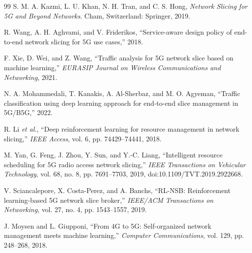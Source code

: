 \documentclass[12pt,a4paper]{report}
\begin{document}
\begin{thebibliography}{99}
S. M. A. Kazmi, L. U. Khan, N. H. Tran, and C. S. Hong,
\textit{Network Slicing for 5G and Beyond Networks}.
Cham, Switzerland: Springer, 2019.

R. Wang, A. H. Aghvami, and V. Friderikos,
``Service-aware design policy of end-to-end network slicing for 5G use
cases,'' 2018.

F. Xie, D. Wei, and Z. Wang,
``Traffic analysis for 5G network slice based on machine learning,''
\textit{EURASIP Journal on Wireless Communications and Networking},
2021.

N. A. Mohammedali, T. Kanakis, A. Al-Sherbaz, and M. O. Agyeman,
``Traffic classification using deep learning approach for end-to-end
slice management in 5G/B5G,'' 2022.

R. Li \textit{et al.},
``Deep reinforcement learning for resource management in network
slicing,'' \textit{IEEE Access}, vol. 6, pp. 74429--74441, 2018.

M. Yan, G. Feng, J. Zhou, Y. Sun, and Y.-C. Liang,
``Intelligent resource scheduling for 5G radio access network slicing,''
\textit{IEEE Transactions on Vehicular Technology}, vol. 68, no. 8,
pp. 7691--7703, 2019,
doi:10.1109/TVT.2019.2922668.

V. Sciancalepore, X. Costa-Perez, and A. Banchs,
``RL-NSB: Reinforcement learning-based 5G network slice broker,''
\textit{IEEE/ACM Transactions on Networking}, vol. 27, no. 4,
pp. 1543--1557, 2019.

J. Moysen and L. Giupponi,
``From 4G to 5G: Self-organized network management meets machine
learning,'' \textit{Computer Communications}, vol. 129,
pp. 248--268, 2018.
	
\end{thebibliography}
	
\end{document}
